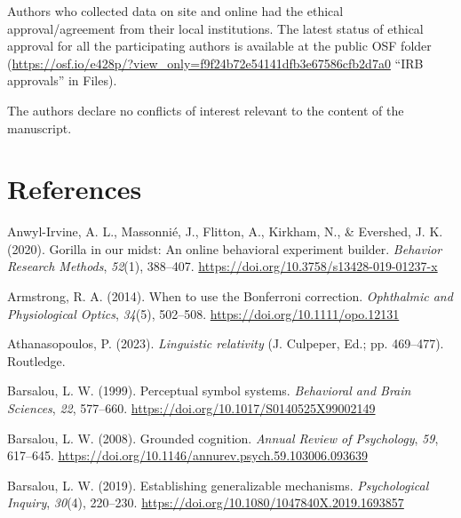 \documentclass[
  man,floatsintext]{apa7}
\newlength{\cslhangindent}
\newlength{\cslentryspacingunit} %
\newenvironment{CSLReferences}[2] %
 {%
  \setlength{\parindent}{0pt}
  \ifodd #1
  \let\oldpar\par
  \def\par{\hangindent=\cslhangindent\oldpar}
  \fi
  \setlength{\parskip}{#2\cslentryspacingunit}
 }%
 {}
\begin{document}
Authors who collected data on site and online had the ethical approval/agreement from their local institutions. The latest status of ethical approval for all the participating authors is available at the public OSF folder (\url{https://osf.io/e428p/?view_only=f9f24b72e54141dfb3e67586cfb2d7a0} ``IRB approvals'' in Files).

The authors declare no conflicts of interest relevant to the content of the manuscript.

\newpage

\hypertarget{references}{%
\section{References}\label{references}}

\hypertarget{refs}{}
\begin{CSLReferences}{1}{0}
\leavevmode{}%
Anwyl-Irvine, A. L., Massonnié, J., Flitton, A., Kirkham, N., \& Evershed, J. K. (2020). Gorilla in our midst: {An} online behavioral experiment builder. \emph{Behavior Research Methods}, \emph{52}(1), 388--407. \url{https://doi.org/10.3758/s13428-019-01237-x}

\leavevmode{}%
Armstrong, R. A. (2014). When to use the {Bonferroni} correction. \emph{Ophthalmic and Physiological Optics}, \emph{34}(5), 502--508. \url{https://doi.org/10.1111/opo.12131}

\leavevmode{}%
Athanasopoulos, P. (2023). \emph{Linguistic relativity} (J. Culpeper, Ed.; pp. 469--477). Routledge.

\leavevmode{}%
Barsalou, L. W. (1999). Perceptual symbol systems. \emph{Behavioral and Brain Sciences}, \emph{22}, 577--660. \url{https://doi.org/10.1017/S0140525X99002149}

\leavevmode{}%
Barsalou, L. W. (2008). Grounded cognition. \emph{Annual Review of Psychology}, \emph{59}, 617--645. \url{https://doi.org/10.1146/annurev.psych.59.103006.093639}

\leavevmode{}%
Barsalou, L. W. (2019). Establishing generalizable mechanisms. \emph{Psychological Inquiry}, \emph{30}(4), 220--230. \url{https://doi.org/10.1080/1047840X.2019.1693857}


\end{CSLReferences}
\end{document}
